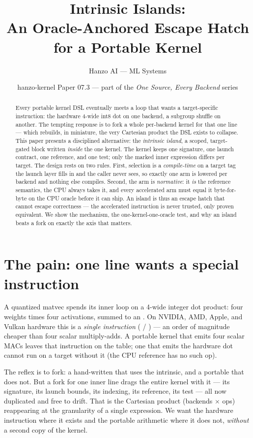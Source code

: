 \documentclass[11pt]{article}
\title{\textbf{Intrinsic Islands:\\ An Oracle-Anchored Escape Hatch for a Portable Kernel}}
\author{Hanzo AI --- ML Systems}
\date{hanzo-kernel Paper 07.3 --- part of the \emph{One Source, Every Backend} series}
\begin{document}
\maketitle

\begin{abstract}
Every portable kernel DSL eventually meets a loop that wants a target-specific instruction: the hardware
4-wide int8 dot on one backend, a subgroup shuffle on another. The tempting response is to fork a whole
per-backend kernel for that one line --- which rebuilds, in miniature, the very Cartesian product the DSL
exists to collapse. This paper presents a disciplined alternative: the \emph{intrinsic island}, a scoped,
target-gated block written \emph{inside} the one kernel. The kernel keeps one signature, one launch
contract, one reference, and one test; only the marked inner expression differs per target. The design
rests on two rules. First, selection is a \emph{compile-time}  on a target tag the launch
layer fills in and the caller never sees, so exactly one arm is lowered per backend and nothing else
compiles. Second, the  arm is \emph{normative}: it \emph{is} the reference semantics, the
CPU always takes it, and every accelerated arm must equal it byte-for-byte on the CPU oracle before it can
ship. An island is thus an escape hatch that cannot escape correctness --- the accelerated instruction is
never trusted, only proven equivalent. We show the mechanism, the one-kernel-one-oracle test, and why an
island beats a fork on exactly the axis that matters.
\end{abstract}

\section{The pain: one line wants a special instruction}
\label{sec:pain}

A quantized matvec spends its inner loop on a 4-wide integer dot product: four  weights times
four  activations, summed to an . On NVIDIA, AMD, Apple, and Vulkan hardware this is
a \emph{single instruction} (\dpa{} / ) --- an order of magnitude cheaper than four
scalar multiply-adds. A portable kernel that emits four scalar MACs leaves that instruction on the table;
one that emits the hardware dot cannot run on a target without it (the CPU reference has no such op).

The reflex is to fork: a hand-written  that uses the intrinsic, and a portable
 that does not. But a fork for one inner line drags the entire kernel with it ---
its signature, its launch bounds, its indexing, its reference, its test --- all now duplicated and free to
drift. That is the Cartesian product (backends $\times$ ops) reappearing at the granularity of a single
expression. We want the hardware instruction where it exists and the portable arithmetic where it does
not, \emph{without} a second copy of the kernel.
\end{document}
